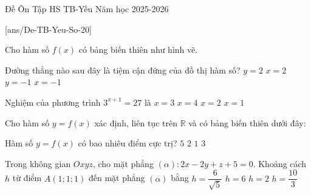 \begin{name}
{Đề Ôn Tập HS TB-Yếu}
{Năm học 2025-2026}
\end{name}

[ans/De-TB-Yeu-So-20]
\TN
\begin{ex}%
	Cho hàm số $f(x)$ có bảng biến thiên như hình vẽ.
	\begin{center}
	\end{center}
	Đường thẳng nào sau đây là tiệm cận đứng của đồ thị hàm số?
	\choice
	{$y=2$}
	{$x=2$}
	{$y=-1$}
	{\True $x=-1$}
\end{ex}

\begin{ex}%
	Nghiệm của phương trình $3^{x+1}=27$ là
	\choice
	{$x=3$}
	{$x=4$}
	{\True $x=2$}
	{$x=1$}
\end{ex}

\begin{ex}%
	Cho hàm số $y=f(x)$ xác định, liên tục trên $\mathbb{R}$ và có bảng biến thiên dưới đây:
	\begin{center}
	\end{center}
	Hàm số $y=f(x)$ có bao nhiêu điểm cực trị?
	\choice
	{$5$}
	{$2$}
	{$1$}
	{\True $3$}
\end{ex}

\begin{ex}%
	Trong không gian $Oxyz$, cho mặt phẳng $(\alpha)\colon 2x-2y+z+5=0$. Khoảng cách $h$ từ điểm $A(1;1;1)$ đến mặt phẳng $(\alpha)$ bằng
	\choice
	{$h=\dfrac{6}{\sqrt{5}}$}
	{$h=6$}
	{\True $h=2$}
	{$h=\dfrac{10}{3}$}
\end{ex}

